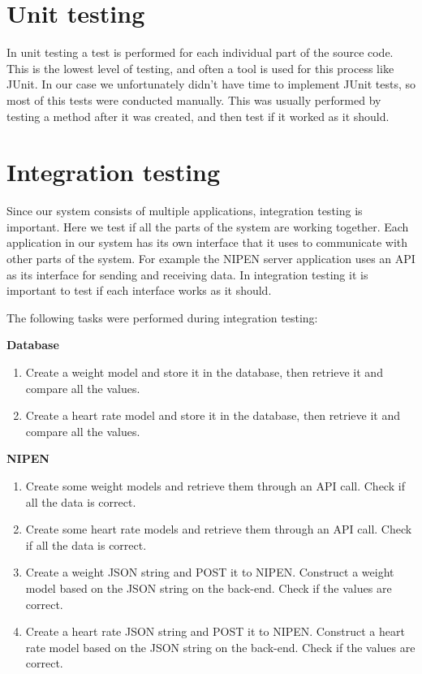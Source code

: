\section{Unit testing}

In unit testing a test is performed for each individual part of the source code.
This is the lowest level of testing, and often a tool is used for this process like JUnit.
In our case we unfortunately didn't have time to implement JUnit tests, so most of this tests were conducted manually.
This was usually performed by testing a method after it was created, and then test if it worked as it should.

\section{Integration testing}

Since our system consists of multiple applications, integration testing is important.
Here we test if all the parts of the system are working together.
Each application in our system has its own interface that it uses to communicate with other parts of the system.
For example the NIPEN server application uses an API as its interface for sending and receiving data.
In integration testing it is important to test if each interface works as it should.

The following tasks were performed during integration testing:

\textbf{Database}
\begin{enumerate}
\item Create a weight model and store it in the database, then retrieve it and compare all the values.
\item Create a heart rate model and store it in the database, then retrieve it and compare all the values.
\end{enumerate}

\textbf{NIPEN}
\begin{enumerate}
\item Create some weight models and retrieve them through an API call. Check if all the data is correct.
\item Create some heart rate models and retrieve them through an API call. Check if all the data is correct.
\item Create a weight JSON string and POST it to NIPEN. Construct a weight model based on the JSON string on the back-end. Check if the values are correct.
\item Create a heart rate JSON string and POST it to NIPEN. Construct a heart rate model based on the JSON string on the back-end. Check if the values are correct.
\end{enumerate}

